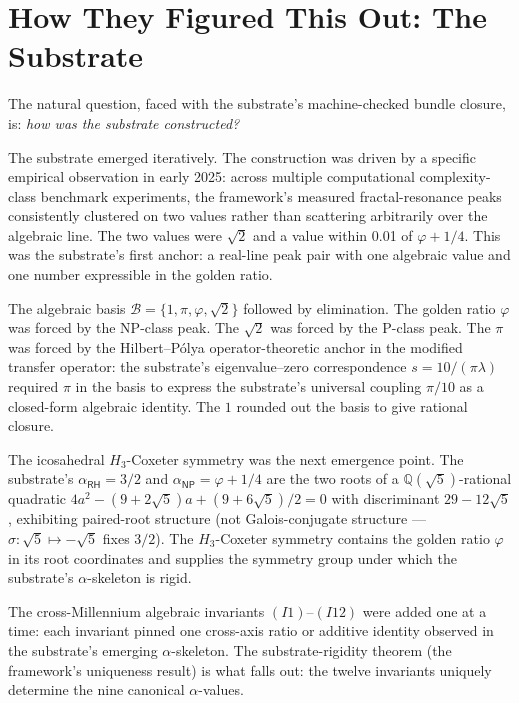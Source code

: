 \documentclass[11pt,a4paper]{amsart}
\theoremstyle{plain}
\theoremstyle{definition}
\begin{document}
\section{How They Figured This Out: The Substrate}\label{sec:how}

The natural question, faced with the substrate's machine-checked bundle closure, is: \emph{how was the substrate constructed?}

The substrate emerged iteratively. The construction was driven by a specific empirical observation in early 2025: across multiple computational complexity-class benchmark experiments, the framework's measured fractal-resonance peaks consistently clustered on two values rather than scattering arbitrarily over the algebraic line. The two values were $\sqrt{2}$ and a value within 0.01 of $\varphi+1/4$. This was the substrate's first anchor: a real-line peak pair with one algebraic value and one number expressible in the golden ratio.

The algebraic basis $\mathcal{B}=\{1,\pi,\varphi,\sqrt{2}\}$ followed by elimination. The golden ratio $\varphi$ was forced by the NP-class peak. The $\sqrt{2}$ was forced by the P-class peak. The $\pi$ was forced by the Hilbert--P\'olya operator-theoretic anchor in the modified transfer operator: the substrate's eigenvalue--zero correspondence $s = 10/(\pi\lambda)$ required $\pi$ in the basis to express the substrate's universal coupling $\pi/10$ as a closed-form algebraic identity. The $1$ rounded out the basis to give rational closure.

The icosahedral $H_3$-Coxeter symmetry was the next emergence point. The substrate's $\alpha_{\textsf{RH}} = 3/2$ and $\alpha_{\textsf{NP}} = \varphi + 1/4$ are the two roots of a $\mathbb{Q}(\sqrt{5})$-rational quadratic $4a^2 - (9+2\sqrt{5})a + (9+6\sqrt{5})/2 = 0$ with discriminant $29-12\sqrt{5}$, exhibiting paired-root structure (not Galois-conjugate structure --- $\sigma:\sqrt{5}\mapsto-\sqrt{5}$ fixes $3/2$). The $H_3$-Coxeter symmetry contains the golden ratio $\varphi$ in its root coordinates and supplies the symmetry group under which the substrate's $\alpha$-skeleton is rigid.

The cross-Millennium algebraic invariants $(I1)$--$(I12)$ were added one at a time: each invariant pinned one cross-axis ratio or additive identity observed in the substrate's emerging $\alpha$-skeleton. The substrate-rigidity theorem (the framework's uniqueness result) is what falls out: the twelve invariants uniquely determine the nine canonical $\alpha$-values.
\end{document}
